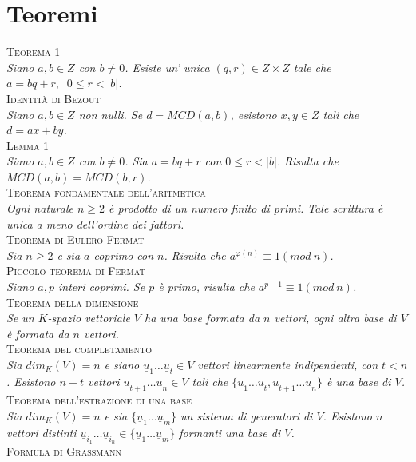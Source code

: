 \documentclass[a4paper,10pt]{article} %
\newcommand{\mtheorem}[1]{%
    {\hspace*{-10pt} \textsc {#1}}}
\renewcommand{\v}[1]{%
    {\underline{#1}}}
\begin{document}
\section{Teoremi}
\mtheorem{Teorema 1}\\
    \emph{Siano $a, b \in Z$ con $b \neq 0$. Esiste un' unica $(q, r) \in Z \times Z$ tale che $a = bq + r, \; \; 0 \leq r < |b|$.}\\
\mtheorem{Identità di Bezout}\\
    \emph{Siano $a, b \in Z$ non nulli. Se $d = MCD(a,b)$, esistono $x, y \in Z$ tali che $d = ax + by$.}\\
\mtheorem{Lemma 1}\\
    \emph{Siano $a, b \in Z$ con $b \neq 0$. Sia $a = bq + r$ con $0 \leq r < |b|$. Risulta che $MCD(a,b) = MCD(b,r)$.}\\
\mtheorem{Teorema fondamentale dell'aritmetica}\\
    \emph{Ogni naturale $n \geq 2$ è prodotto di un numero finito di primi. Tale scrittura è unica a meno dell'ordine dei fattori.}\\
\mtheorem{Teorema di Eulero-Fermat}\\
    \emph{Sia $n \geq 2$ e sia $a$ coprimo con $n$. Risulta che $a^{\varphi(n)} \equiv 1 (mod\ n)$.}\\
\mtheorem{Piccolo teorema di Fermat}\\
    \emph{Siano $a, p$ interi coprimi. Se $p$ è primo, risulta che $a^{p-1} \equiv 1 (mod\ n)$.}\\
\mtheorem{Teorema della dimensione}\\
    \emph{Se un $K$-spazio vettoriale $V$ ha una base formata da $n$ vettori, ogni altra base di $V$ è formata da $n$ vettori.}\\
\mtheorem{Teorema del completamento}\\
    \emph{Sia $dim_K(V) = n$ e siano $\v{u}_1 \ldots \v{u}_t \in V$ vettori linearmente indipendenti, con $t < n$. Esistono $n - t$ vettori $\v{u}_{t+1} \ldots \v{u}_n \in V$ tali che $\{ \v{u}_1 \ldots \v{u}_t, \v{u}_{t+1} \ldots \v{u}_n\}$ è una base di $V$.}\\
\mtheorem{Teorema dell'estrazione di una base}\\
    \emph{Sia $dim_K(V) = n$ e sia $\{ \v{u}_1 \ldots \v{u}_m \}$ un sistema di generatori di $V$. Esistono $n$ vettori distinti $\v{u}_{i_1} \ldots \v{u}_{i_n} \in \{ \v{u}_1 \ldots \v{u}_m \}$ formanti una base di $V$.}\\
\mtheorem{Formula di Grassmann}\\
\end{document}
